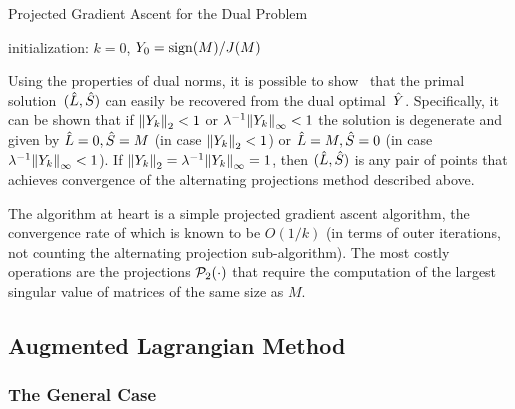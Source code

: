 \documentclass{../../common/projectreport}
\begin{document}
%
\begin{algorithm}
\caption{Projected Gradient Ascent for the Dual Problem}
initialization: $k=0$, $Y_0 = \operatorname{sign}(M)/J(M)$\;
\label{Algorithms:MainAlgs:GAD:Algorithm}
\end{algorithm}

Using the properties of dual norms, it is possible to show~\cite{Lin:2009kx} that the primal solution~$({\hat{L}},{\hat{S}})$ can easily be recovered from the dual optimal~${\hat{Y}}$. Specifically, it can be shown that if ${\left\|Y_k\right\|}_{2}^{} <1$ or $\lambda^{-1}{\left\|Y_k\right\|}_{\infty}^{}<1$ the solution is degenerate and given by ${\hat{L}} = 0,{\hat{S}} =M$ (in case ${\left\|Y_k\right\|}_{2}^{} <1$) or ${\hat{L}} = M,{\hat{S}} =0$ (in case $\lambda^{-1} {\left\|Y_k\right\|}_{\infty}^{} <1$). If ${\left\|Y_k\right\|}_{2}^{} = \lambda^{-1} {\left\|Y_k\right\|}_{\infty}^{} =1$, then $({\hat{L}},{\hat{S}})$ is any pair of points that achieves convergence of the alternating projections method described above. 

The algorithm at heart is a simple projected gradient ascent algorithm, the convergence rate of which is known to be $O(1/k)$ (in terms of outer iterations, not counting the alternating projection sub-algorithm). The most costly operations are the projections ${\mathcal{P}}_{2}(\cdot)$ that require the computation of the largest singular value of matrices of the same size as $M$. 




\subsection{Augmented Lagrangian Method}
\label{Algorithms:MainAlgs:AugLag:Subsec}


\subsubsection{The General Case}
\label{Algorithms:MainAlgs:AugLag:General:Subsubsec}
\end{document}
